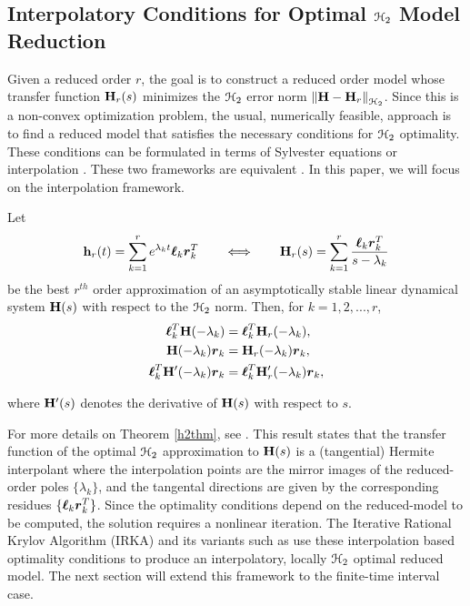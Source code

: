 \documentclass[twocolumn]{autart}
\begin{document}
\subsection{Interpolatory Conditions for Optimal $\EuScript{H}_2$ Model Reduction}
Given a reduced order $r$, the goal is to construct a reduced order model whose transfer function $\mathbf{H}_r(s)$ minimizes the $\EuScript{H}_2$ error norm $\left\lVert\mathbf{H} - \mathbf{H}_r\right\rVert_{\EuScript{H}_2}$.  Since this is a non-convex optimization problem, the usual, numerically feasible, approach  is to find a reduced model that satisfies the necessary conditions for $\EuScript{H}_2$ optimality. These conditions can be formulated in terms of Sylvester equations \cite{Wil70,HylB85} or interpolation \cite{MeiL67,GugBA08}. These two frameworks are equivalent \cite{GugBA08}. In this paper, we will focus on the interpolation framework.
\begin{theorem} \label{h2thm}%
Let 
$$
\mathbf{h}_r(t)=\sum_{k=1}^r e^{\lambda_kt}\boldsymbol{\ell}_k\boldsymbol{r}_k^T \qquad \Longleftrightarrow \qquad \mathbf{H}_r(s) = \sum_{k=1}^r \frac{\boldsymbol{\ell}_k\boldsymbol{r}_k^T}{s-\lambda_k}
$$
be the best $r^{th}$ order approximation of an asymptotically stable linear dynamical system  $\mathbf{H}(s)$ with respect to the $\EuScript{H}_2$ norm. Then, for $k=1, 2, ... , r$,
\begin{equation} \label{eqn:h2cond}
\begin{aligned}
\boldsymbol{\ell}_k^T\mathbf{H}(-\lambda_k)&=\boldsymbol{\ell}_k^T\mathbf{H}_r(-\lambda_k),\\~~
\mathbf{H}(-\lambda_k)\boldsymbol{r}_k&=\mathbf{H}_r(-\lambda_k)\boldsymbol{r}_k,\\
\boldsymbol{\ell}_k^T\mathbf{H}'(-\lambda_k)\boldsymbol{r}_k&=\boldsymbol{\ell}_k^T\mathbf{H}_r'(-\lambda_k)\boldsymbol{r}_k,
\end{aligned}
\end{equation}

{\color{black} where $\mathbf{H}'(s)$ denotes the derivative of $\mathbf{H}(s)$ with respect to $s$.}
\end{theorem}
{\color{black}For more details on Theorem \ref{h2thm}, see {\cite {GugBA08,AntBG10b}}.}
This result states that the transfer function of the optimal $\EuScript{H}_2$ approximation to $\mathbf{H}(s)$ is a (tangential) Hermite interpolant where the interpolation points are the mirror images of the reduced-order poles $\{\lambda_k\}$, and the tangental directions are given by the corresponding residues $\{\boldsymbol{\ell}_k\boldsymbol{r}_k^T\}$.  Since the optimality conditions depend on the reduced-model to be computed, the solution requires a nonlinear iteration. The Iterative Rational Krylov Algorithm (IRKA)  \cite{GugBA08} and its variants such as \cite{beattie2012realization,gerstner2007hom,CasL18,beattie2009trust} use these interpolation based optimality conditions to produce   an interpolatory, locally $\EuScript{H}_2$ optimal reduced model. The next section will extend this framework to the finite-time interval case.
\end{document}
